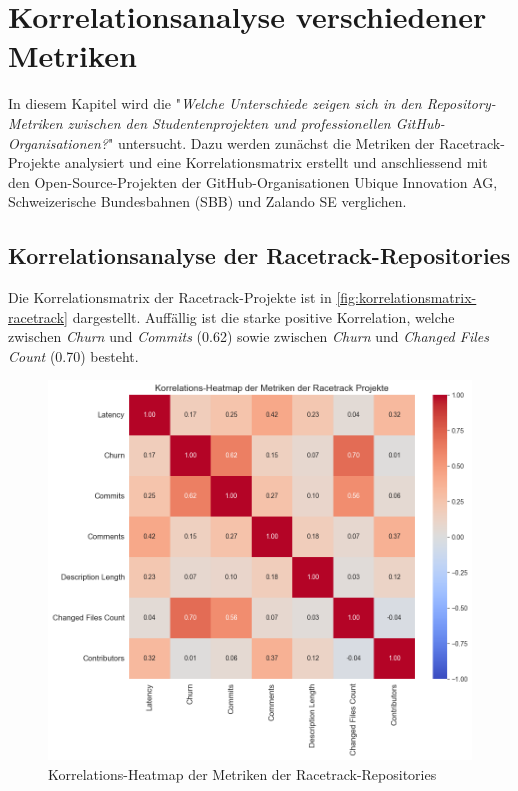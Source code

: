 \section{Korrelationsanalyse verschiedener Metriken}
\label{sec:Korrelationsanalyse}
In diesem Kapitel wird die  "\textit{Welche Unterschiede zeigen sich in den Repository-Metriken
zwischen den Studentenprojekten und professionellen GitHub-Organisationen?}" untersucht. Dazu werden zunächst die Metriken der Racetrack-Projekte analysiert und eine Korrelationsmatrix erstellt und anschliessend mit den Open-Source-Projekten der GitHub-Organisationen Ubique Innovation AG, Schweizerische Bundesbahnen (SBB) und Zalando SE verglichen.
\subsection{Korrelationsanalyse der Racetrack-Repositories}
Die Korrelationsmatrix der Racetrack-Projekte ist in \autoref{fig:korrelationsmatrix-racetrack} dargestellt. Auffällig ist die starke positive Korrelation, welche zwischen \textit{Churn} und \textit{Commits} (0.62) sowie zwischen \textit{Churn} und \textit{Changed Files Count} (0.70) besteht. 

\begin{figure}[htbp]
    \includegraphics[width=\textwidth]{Figures/racetrack-korrelationsmatrix.png}
    \caption{Korrelations-Heatmap der Metriken der Racetrack-Repositories}
    \label{fig:korrelationsmatrix-racetrack}
\end{figure}


